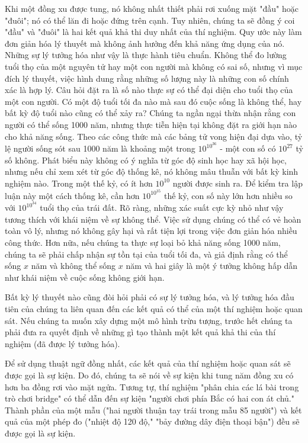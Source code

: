 \documentclass[12pt]{article} %
\begin{document}
Khi một đồng xu được tung, nó không nhất thiết phải rơi xuống mặt "đầu" hoặc "đuôi"; nó có thể lăn đi hoặc đứng trên cạnh. Tuy nhiên, chúng ta sẽ đồng ý coi "đầu" và "đuôi" là hai kết quả khả thi duy nhất của thí nghiệm. Quy ước này làm đơn giản hóa lý thuyết mà không ảnh hưởng đến khả năng ứng dụng của nó. Những sự lý tưởng hóa như vậy là thực hành tiêu chuẩn. Không thể đo lường tuổi thọ của một nguyên tử hay một con người mà không có sai số, nhưng vì mục đích lý thuyết, việc hình dung rằng những số lượng này là những con số chính xác là hợp lý. Câu hỏi đặt ra là số nào thực sự có thể đại diện cho tuổi thọ của một con người. Có một độ tuổi tối đa nào mà sau đó cuộc sống là không thể, hay bất kỳ độ tuổi nào cũng có thể xảy ra? Chúng ta ngần ngại thừa nhận rằng con người có thể sống 1000 năm, nhưng thực tiễn hiện tại không đặt ra giới hạn nào cho khả năng sống. Theo các công thức mà các bảng tử vong hiện đại dựa vào, tỷ lệ người sống sót sau 1000 năm là khoảng một trong $10^{10^{36}}$ - một con số có $10^{27}$ tỷ số không. Phát biểu này không có ý nghĩa từ góc độ sinh học hay xã hội học, nhưng nếu chỉ xem xét từ góc độ thống kê, nó không mâu thuẫn với bất kỳ kinh nghiệm nào. Trong một thế kỷ, có ít hơn $10^{10}$ người được sinh ra. Để kiểm tra lập luận này một cách thống kê, cần hơn $10^{10^{35}}$ thế kỷ, con số này lớn hơn nhiều so với $10^{10^{34}}$ tuổi thọ của trái đất. Rõ ràng, những xác suất cực kỳ nhỏ như vậy tương thích với khái niệm về sự không thể. Việc sử dụng chúng có thể có vẻ hoàn toàn vô lý, nhưng nó không gây hại và rất tiện lợi trong việc đơn giản hóa nhiều công thức. Hơn nữa, nếu chúng ta thực sự loại bỏ khả năng sống 1000 năm, chúng ta sẽ phải chấp nhận sự tồn tại của tuổi tối đa, và giả định rằng có thể sống $x$ năm và không thể sống $x$ năm và hai giây là một ý tưởng không hấp dẫn như khái niệm về cuộc sống không giới hạn.

Bất kỳ lý thuyết nào cũng đòi hỏi phải có sự lý tưởng hóa, và lý tưởng hóa đầu tiên của chúng ta liên quan đến các kết quả có thể của một thí nghiệm hoặc quan sát. Nếu chúng ta muốn xây dựng một mô hình trừu tượng, trước hết chúng ta phải đưa ra quyết định về những gì tạo thành một kết quả khả thi của thí nghiệm (đã được lý tưởng hóa).

Để sử dụng thuật ngữ đồng nhất, các kết quả của thí nghiệm hoặc quan sát sẽ được gọi là sự kiện. Do đó, chúng ta sẽ nói về sự kiện khi tung năm đồng xu có hơn ba đồng rơi vào mặt ngửa. Tương tự, thí nghiệm "phân chia các lá bài trong trò chơi bridge" có thể dẫn đến sự kiện "người chơi phía Bắc có hai con át chủ." Thành phần của một mẫu ("hai người thuận tay trái trong mẫu 85 người") và kết quả của một phép đo ("nhiệt độ 120 độ," "bảy đường dây điện thoại bận") đều sẽ được gọi là sự kiện.
\end{document}
